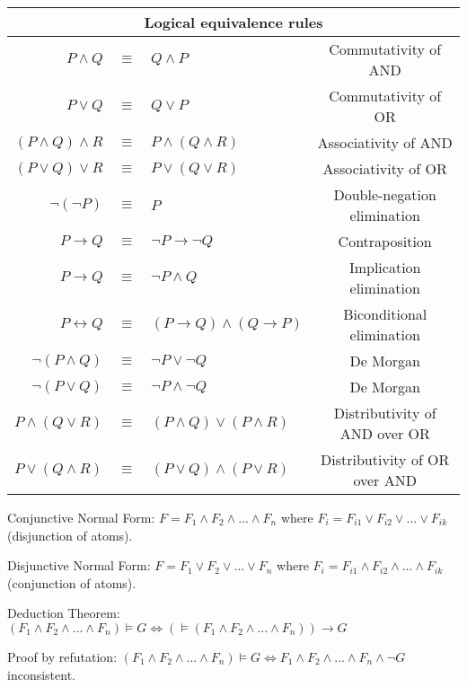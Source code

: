 \documentclass[]{article}
\begin{document}
\begin{table}[h]
	\centering
	\begin{tabular}{ | r  c  l  c | } 
		\hline
		\multicolumn{4}{|c|}{Logical equivalence rules} \\
		\hline
		$P \land Q$ & $\equiv$ & $Q \land P$ & Commutativity of AND\\
		\hline
		$P \lor Q$ & $\equiv$ & $Q \lor P$ & Commutativity of OR\\
		\hline
		$(P \land Q) \land R$ & $\equiv$ & $P \land (Q \land R)$ & Associativity of AND\\
		\hline
		$(P \lor Q) \lor R$ & $\equiv$ & $P \lor (Q \lor R)$ & Associativity of OR\\
		\hline
		$\neg(\neg P)$ & $\equiv$ & $P$ & Double-negation elimination\\
		\hline
		$P \rightarrow Q$ & $\equiv$ & $\neg P \rightarrow \neg Q$ & Contraposition\\
		\hline
		$P \rightarrow Q$ & $\equiv$ & $\neg P \land Q$ & Implication elimination\\
		\hline
		$P \leftrightarrow Q$ & $\equiv$ & $(P \rightarrow Q) \land (Q \rightarrow P)$ & Biconditional elimination \\
		\hline
		$\neg(P \land Q)$ & $\equiv$ & $\neg P \lor \neg Q$ & De Morgan\\
		\hline
		$\neg(P \lor Q)$ & $\equiv$ & $\neg P \land \neg Q$ & De Morgan\\
		\hline
		$P \land (Q \lor R)$ & $\equiv$ & $(P \land Q) \lor (P \land R)$ & Distributivity of AND over OR\\
		\hline
		$P \lor (Q \land R)$ & $\equiv$ & $(P \lor Q) \land (P \lor R)$ & Distributivity of OR over AND\\
		\hline
	\end{tabular}
\end{table}

\noindent Conjunctive Normal Form: $F = F_1 \land F_2 \land ... \land F_n $ where $F_i = F_{i1} \lor F_{i2} \lor ... \lor F_{ik} $ (disjunction of atoms).

\noindent Disjunctive Normal Form: $F = F_1 \lor F_2 \lor ... \lor F_n $ where $F_i = F_{i1} \land F_{i2} \land ... \land F_{ik} $ (conjunction of atoms).

\noindent Deduction Theorem: $(F_1 \land F_2 \land ... \land F_n) \vDash G \iff (\vDash(F_1 \land F_2 \land ... \land F_n)) \rightarrow G$

\noindent Proof by refutation: $(F_1 \land F_2 \land ... \land F_n) \vDash G \iff F_1 \land F_2 \land ... \land F_n \land \neg G $ inconsistent.
\end{document}

